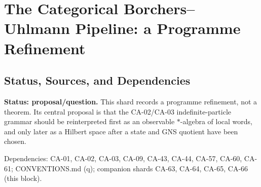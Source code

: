 
\section{The Categorical Borchers--Uhlmann Pipeline: a Programme Refinement}
\label{sec:categorical-bu-pipeline-vision}

\subsection{Status, Sources, and Dependencies}

\textbf{Status: proposal/question.}  This shard records a programme refinement,
not a theorem.  Its central proposal is that the CA-02/CA-03
indefinite-particle grammar should be reinterpreted first as an observable
\(*\)-algebra of local words, and only later as a Hilbert space after a state
and GNS quotient have been chosen.

Dependencies: CA-01, CA-02, CA-03, CA-09, CA-43, CA-44, CA-57, CA-60,
CA-61; CONVENTIONS.md (q); companion shards CA-63, CA-64, CA-65, CA-66
(this block).

